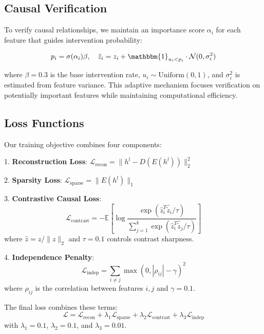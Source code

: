 \documentclass{article} %
\begin{document}
\subsection{Causal Verification}
To verify causal relationships, we maintain an importance score $\alpha_i$ for each feature that guides intervention probability:

\begin{equation}
    p_i = \sigma(\alpha_i)\beta, \quad \tilde{z}_i = z_i + \mathbbm{1}_{u_i < p_i} \cdot \mathcal{N}(0, \sigma_i^2)
\end{equation}

where $\beta=0.3$ is the base intervention rate, $u_i \sim \text{Uniform}(0,1)$, and $\sigma_i^2$ is estimated from feature variance. This adaptive mechanism focuses verification on potentially important features while maintaining computational efficiency.

\subsection{Loss Functions}
Our training objective combines four components:

1. \textbf{Reconstruction Loss}: $\mathcal{L}_{\text{recon}} = \|h^l - D(E(h^l))\|_2^2$

2. \textbf{Sparsity Loss}: $\mathcal{L}_{\text{sparse}} = \|E(h^l)\|_1$

3. \textbf{Contrastive Causal Loss}:
\begin{equation}
    \mathcal{L}_{\text{contrast}} = -\mathbb{E}\left[\log\frac{\exp(\hat{z}_i^T\hat{\tilde{z}}_i/\tau)}{\sum_{j=1}^k \exp(\hat{z}_i^T\hat{\tilde{z}}_j/\tau)}\right]
\end{equation}
where $\hat{z} = z/\|z\|_2$ and $\tau=0.1$ controls contrast sharpness.

4. \textbf{Independence Penalty}:
\begin{equation}
    \mathcal{L}_{\text{indep}} = \sum_{i\neq j} \max(0, |\rho_{ij}| - \gamma)^2
\end{equation}
where $\rho_{ij}$ is the correlation between features $i,j$ and $\gamma=0.1$.

The final loss combines these terms:
\begin{equation}
    \mathcal{L} = \mathcal{L}_{\text{recon}} + \lambda_1\mathcal{L}_{\text{sparse}} + \lambda_2\mathcal{L}_{\text{contrast}} + \lambda_3\mathcal{L}_{\text{indep}}
\end{equation}
with $\lambda_1=0.1$, $\lambda_2=0.1$, and $\lambda_3=0.01$.
\end{document}
